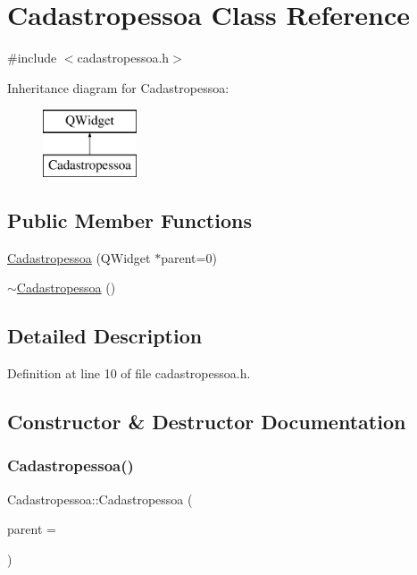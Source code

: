 \hypertarget{class_cadastropessoa}{}\section{Cadastropessoa Class Reference}
\label{class_cadastropessoa}


{\ttfamily \#include $<$cadastropessoa.\+h$>$}

Inheritance diagram for Cadastropessoa\+:\begin{figure}[H]
\begin{center}
\leavevmode
\includegraphics[height=2.000000cm]{class_cadastropessoa}
\end{center}
\end{figure}
\subsection*{Public Member Functions}
\begin{DoxyCompactItemize}
\item 
\hyperlink{class_cadastropessoa_a706230f399727160a6fd25592f77da12}{Cadastropessoa} (Q\+Widget $\ast$parent=0)
\item 
\hyperlink{class_cadastropessoa_a19e6b26d15f77eb6844e67b1246661cf}{$\sim$\+Cadastropessoa} ()
\end{DoxyCompactItemize}


\subsection{Detailed Description}


Definition at line 10 of file cadastropessoa.\+h.



\subsection{Constructor \& Destructor Documentation}
\hypertarget{class_cadastropessoa_a706230f399727160a6fd25592f77da12}{}\label{class_cadastropessoa_a706230f399727160a6fd25592f77da12} 
\subsubsection{\texorpdfstring{Cadastropessoa()}{Cadastropessoa()}}
{\footnotesize\ttfamily Cadastropessoa\+::\+Cadastropessoa (\begin{DoxyParamCaption}\item[{Q\+Widget $\ast$}]{parent = {} }\end{DoxyParamCaption})\hspace{0.3cm}{\ttfamily [explicit]}}



